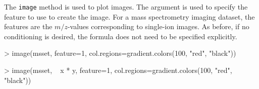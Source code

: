 \documentclass[a4paper]{article}
\begin{document}
The \verb|image| method is used to plot images. The  argument is used to specify the feature to use to create the image. For a mass spectrometry imaging dataset, the features are the $m/z$-values corresponding to single-ion images. As before, if no conditioning is desired, the formula does not need to be specified explicitly.
\begin{Schunk}
\begin{Sinput}
> image(msset, feature=1, col.regions=gradient.colors(100, "red", "black"))
\end{Sinput}
\end{Schunk}
\begin{Schunk}
\begin{Sinput}
> image(msset, ~ x * y, feature=1, col.regions=gradient.colors(100, "red", "black"))
\end{Sinput}
\end{Schunk}
\end{document}
